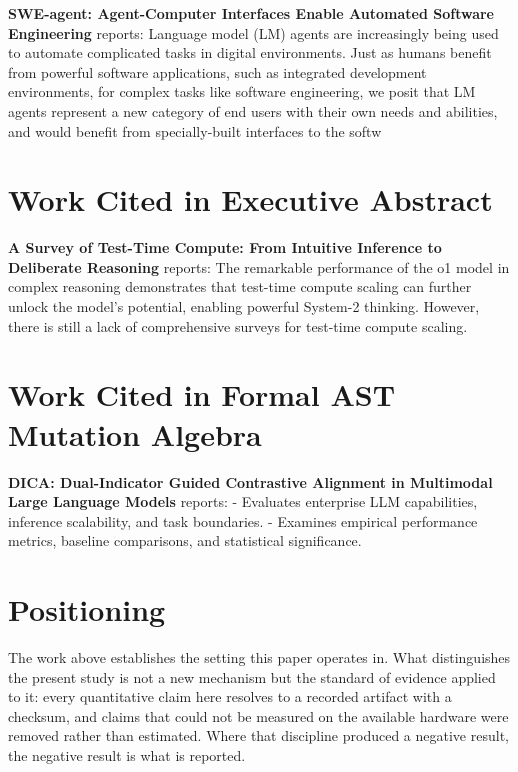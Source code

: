 \documentclass[10pt,twocolumn,letterpaper]{article}
\begin{document}
\textbf{SWE-agent: Agent-Computer Interfaces Enable Automated Software Engineering} \cite{crossref_10_48550_arxiv_2405_15793} reports: Language model (LM) agents are increasingly being used to automate complicated tasks in digital environments. Just as humans benefit from powerful software applications, such as integrated development environments, for complex tasks like software engineering, we posit that LM agents represent a new category of end users with their own needs and abilities, and would benefit from specially-built interfaces to the softw


\section{Work Cited in Executive Abstract}


\textbf{A Survey of Test-Time Compute: From Intuitive Inference to Deliberate Reasoning} \cite{arxiv_2501_02497} reports: The remarkable performance of the o1 model in complex reasoning demonstrates that test-time compute scaling can further unlock the model's potential, enabling powerful System-2 thinking. However, there is still a lack of comprehensive surveys for test-time compute scaling.


\section{Work Cited in Formal AST Mutation Algebra}


\textbf{DICA: Dual-Indicator Guided Contrastive Alignment in Multimodal Large Language Models} \cite{crossref_10_18653_v1_2026_findings_acl_1933} reports: - Evaluates enterprise LLM capabilities, inference scalability, and task boundaries. - Examines empirical performance metrics, baseline comparisons, and statistical significance.


\section{Positioning}


The work above establishes the setting this paper operates in. What distinguishes the present study is not a new mechanism but the standard of evidence applied to it: every quantitative claim here resolves to a recorded artifact with a checksum, and claims that could not be measured on the available hardware were removed rather than estimated. Where that discipline produced a negative result, the negative result is what is reported.
\end{document}
